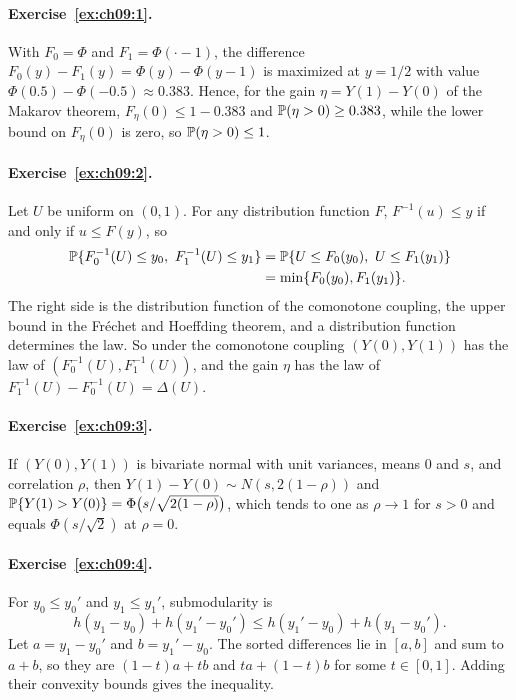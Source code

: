 \paragraph{Exercise~\ref{ex:ch09:1}.} With $F_0 = \Phi$ and $F_1 = \Phi(\cdot - 1)$, the difference $F_0(y) - F_1(y) = \Phi(y) - \Phi(y - 1)$ is maximized at $y = 1/2$ with value $\Phi(0.5) - \Phi(-0.5) \approx 0.383$. Hence, for the gain $\eta = Y(1) - Y(0)$ of the Makarov theorem, $F_\eta(0) \leq 1 - 0.383$ and $\mathbb{P}(\eta > 0) \geq 0.383$, while the lower bound on $F_\eta(0)$ is zero, so $\mathbb{P}(\eta > 0) \leq 1$.

\paragraph{Exercise~\ref{ex:ch09:2}.} Let $U$ be uniform on $(0, 1)$. For any distribution function $F$, $F^{-1}(u) \le y$ if and only if $u \le F(y)$, so
\begin{align*}
\mathbb{P}\{F_0^{-1}(U) \le y_0,\ F_1^{-1}(U) \le y_1\} &= \mathbb{P}\{U \le F_0(y_0),\ U \le F_1(y_1)\}\\
&= \min\{F_0(y_0), F_1(y_1)\}.
\end{align*}
The right side is the distribution function of the comonotone coupling, the upper bound in the Fr\'echet and Hoeffding theorem, and a distribution function determines the law. So under the comonotone coupling $(Y(0), Y(1))$ has the law of $(F_0^{-1}(U), F_1^{-1}(U))$, and the gain $\eta$ has the law of $F_1^{-1}(U) - F_0^{-1}(U) = \Delta(U)$. 

\paragraph{Exercise~\ref{ex:ch09:3}.} If $(Y(0), Y(1))$ is bivariate normal with unit variances, means $0$ and $s$, and correlation $\rho$, then $Y(1) - Y(0) \sim N(s, 2(1 - \rho))$ and $\mathbb{P}\{Y(1) > Y(0)\} = \Phi\bigl(s/\sqrt{2(1 - \rho)}\bigr)$, which tends to one as $\rho \to 1$ for $s > 0$ and equals $\Phi(s/\sqrt{2})$ at $\rho = 0$.

\paragraph{Exercise~\ref{ex:ch09:4}.} For $y_0 \le y_0'$ and $y_1 \le y_1'$, submodularity is
\[
h(y_1 - y_0) + h(y_1' - y_0') \le h(y_1' - y_0) + h(y_1 - y_0').
\]
Let $a = y_1 - y_0'$ and $b = y_1' - y_0$. The sorted differences lie in $[a, b]$ and sum to $a + b$, so they are $(1 - t)a + tb$ and $ta + (1 - t)b$ for some $t \in [0, 1]$. Adding their convexity bounds gives the inequality.

